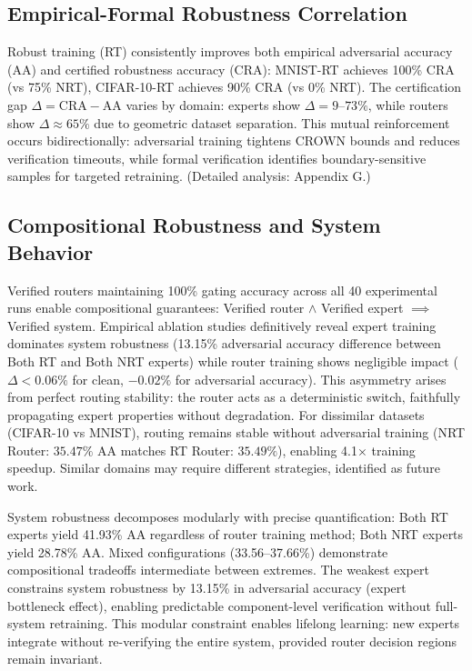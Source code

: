 \documentclass[11pt,a4paper]{article}
\begin{document}
\subsection{Empirical-Formal Robustness Correlation}

Robust training (RT) consistently improves both empirical adversarial accuracy (AA) and certified robustness accuracy (CRA): MNIST-RT achieves 100\% CRA (vs 75\% NRT), CIFAR-10-RT achieves 90\% CRA (vs 0\% NRT). The certification gap $\Delta = \text{CRA} - \text{AA}$ varies by domain: experts show $\Delta = 9$--$73\%$, while routers show $\Delta \approx 65\%$ due to geometric dataset separation. This mutual reinforcement occurs bidirectionally: adversarial training tightens CROWN bounds and reduces verification timeouts, while formal verification identifies boundary-sensitive samples for targeted retraining. (Detailed analysis: Appendix G.)

\subsection{Compositional Robustness and System Behavior}

Verified routers maintaining 100\% gating accuracy across all 40 experimental runs enable compositional guarantees: Verified router $\land$ Verified expert $\implies$ Verified system. Empirical ablation studies definitively reveal expert training dominates system robustness (13.15\% adversarial accuracy difference between Both RT and Both NRT experts) while router training shows negligible impact ($\Delta < 0.06\%$ for clean, $-0.02\%$ for adversarial accuracy). This asymmetry arises from perfect routing stability: the router acts as a deterministic switch, faithfully propagating expert properties without degradation. For dissimilar datasets (CIFAR-10 vs MNIST), routing remains stable without adversarial training (NRT Router: $35.47\%$ AA matches RT Router: $35.49\%$), enabling 4.1$\times$ training speedup. Similar domains may require different strategies, identified as future work.

System robustness decomposes modularly with precise quantification: Both RT experts yield 41.93\% AA regardless of router training method; Both NRT experts yield 28.78\% AA. Mixed configurations (33.56--37.66\%) demonstrate compositional tradeoffs intermediate between extremes. The weakest expert constrains system robustness by 13.15\% in adversarial accuracy (expert bottleneck effect), enabling predictable component-level verification without full-system retraining. This modular constraint enables lifelong learning: new experts integrate without re-verifying the entire system, provided router decision regions remain invariant.
\end{document}
